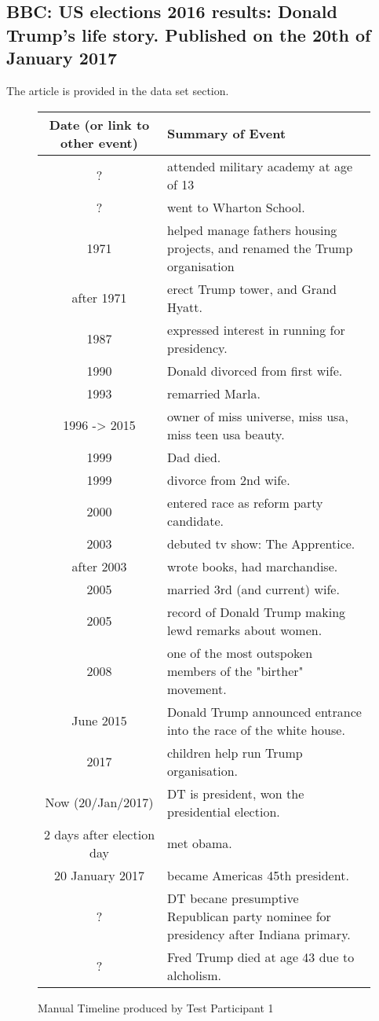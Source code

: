 \subsection{BBC: US elections 2016 results: Donald Trump's life story. Published on the 20th of January 2017}
\par The article is provided in the data set section.
\begin{figure}[H]
\begin{tabular}{|c|p{8.5cm}|}
\hline
Date (or link to other event) & Summary of Event\\
\hline
\hline
? & attended military academy at age of 13\\
\hline
? & went to Wharton School.\\
\hline
1971 & helped manage fathers housing projects, and renamed the Trump organisation\\
\hline
after 1971 & erect Trump tower, and Grand Hyatt.\\
\hline
1987 & expressed interest in running for presidency.\\
\hline
1990 & Donald divorced from first wife.\\
\hline
1993 & remarried Marla.\\
\hline
1996 -> 2015 &  owner of miss universe, miss usa, miss teen usa beauty.\\
\hline
1999 & Dad died.\\
\hline
1999 & divorce from 2nd wife.\\
\hline
2000 & entered race as reform party candidate.\\
\hline
2003 & debuted tv show: The Apprentice.\\
\hline
after 2003 & wrote books, had marchandise.\\
\hline
2005 & married 3rd (and current) wife.\\
\hline
2005 & record of Donald Trump making lewd remarks about women.\\
\hline
2008 & one of the most outspoken members of the "birther" movement.\\
\hline
June 2015 & Donald Trump announced entrance into the race of the white house.\\
\hline
2017 & children help run Trump organisation.\\
\hline
Now (20/Jan/2017) & DT is president, won the presidential election.\\
\hline
2 days after election day & met obama.\\
\hline
20 January 2017 & became Americas 45th president.\\
\hline
? &DT becane presumptive Republican party nominee for presidency after Indiana primary.\\
\hline
? & Fred Trump died at age 43 due to alcholism.\\
\hline
\end{tabular}
\caption{Manual Timeline produced by Test Participant 1}
\end{figure}

